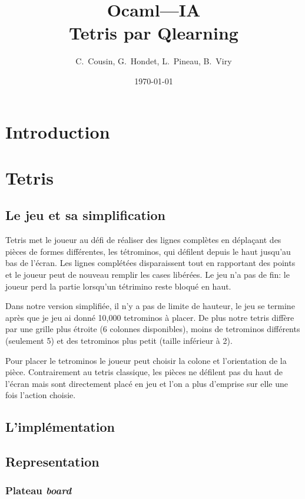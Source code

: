 \documentclass{article}
\title{Ocaml---IA\\Tetris par Qlearning}
\author{C.~Cousin, G.~Hondet, L.~Pineau, B.~Viry}
\date{\today}
\begin{document}
\maketitle
\tableofcontents


\section*{Introduction}

\section{Tetris}

\subsection{Le jeu et sa simplification}
Tetris met le joueur au défi de réaliser des lignes complètes en déplaçant des
pièces de formes différentes, les tétrominos, qui défilent depuis le haut
jusqu'au bas de l'écran. Les lignes complétées disparaissent tout en rapportant
des points et le joueur peut de nouveau remplir les cases libérées. Le jeu
n'a pas de fin: le joueur perd la partie lorsqu'un tétrimino reste bloqué en
haut.

Dans notre version simplifiée, il n'y a pas de limite de hauteur, le jeu se
termine après que je jeu ai donné 10,000 tetrominos à placer. De plus notre
tetris diffère par une grille plus étroite (6 colonnes disponibles), moins de
tetrominos différents (seulement 5) et des tetrominos plus petit (taille
inférieur à 2).

Pour placer le tetrominos le joueur peut choisir la colone et l'orientation de
la pièce. Contrairement au tetris classique, les pièces ne défilent pas du haut
de l'écran mais sont directement placé en jeu et l'on a plus d'emprise sur elle
une fois l'action choisie.

\subsection{L'impl\'ementation}

\subsection{Representation}

\subsubsection{Plateau \textit{board}}
\end{document}
